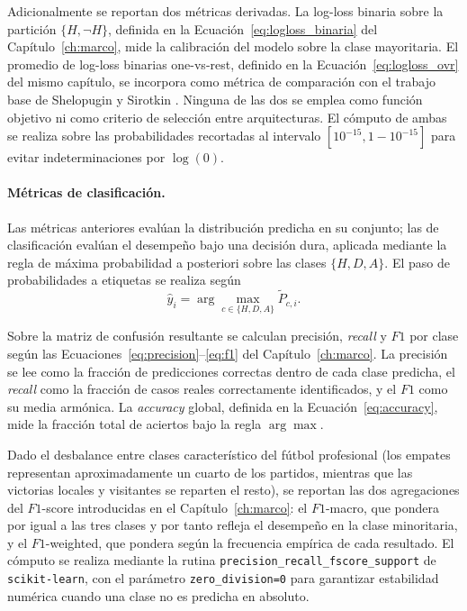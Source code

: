 Adicionalmente se reportan dos m\'etricas derivadas. La log-loss binaria sobre la partici\'on $\{H, \neg H\}$, definida en la Ecuaci\'on~\eqref{eq:logloss_binaria} del Cap\'itulo~\ref{ch:marco}, mide la calibraci\'on del modelo sobre la clase mayoritaria. El promedio de log-loss binarias one-vs-rest, definido en la Ecuaci\'on~\eqref{eq:logloss_ovr} del mismo cap\'itulo, se incorpora como m\'etrica de comparaci\'on con el trabajo base de Shelopugin y Sirotkin \cite{Glicko2Mod}. Ninguna de las dos se emplea como funci\'on objetivo ni como criterio de selecci\'on entre arquitecturas. El c\'omputo de ambas se realiza sobre las probabilidades recortadas al intervalo $[10^{-15}, 1-10^{-15}]$ para evitar indeterminaciones por $\log(0)$.

\paragraph{M\'etricas de clasificaci\'on.} Las m\'etricas 
anteriores eval\'uan la distribuci\'on predicha en su conjunto; las de clasificaci\'on eval\'uan el desempe\~no bajo una decisi\'on dura, aplicada mediante la regla de m\'axima probabilidad a posteriori sobre las clases $\{H, D, A\}$. El paso de probabilidades a etiquetas se realiza seg\'un
\begin{equation}
	\hat{y}_i = \arg\max_{c\in\{H,D,A\}} \tilde{P}_{c,i}.
	\label{eq:argmax_impl}
\end{equation}

Sobre la matriz de confusi\'on resultante se calculan precisi\'on, \emph{recall} y $F1$ por clase seg\'un las Ecuaciones~\eqref{eq:precision}--\eqref{eq:f1} del Cap\'itulo~\ref{ch:marco}. La precisi\'on se lee como la fracci\'on de predicciones correctas dentro de cada clase predicha, el \emph{recall} como la fracci\'on de casos reales correctamente identificados, y el $F1$ como su media arm\'onica. La \emph{accuracy} global, definida en la Ecuaci\'on~\eqref{eq:accuracy}, mide la fracci\'on total de aciertos bajo la regla $\arg\max$.

Dado el desbalance entre clases caracter\'istico del f\'utbol profesional (los empates representan aproximadamente un cuarto de los partidos, mientras que las victorias locales y visitantes se reparten el resto), se reportan las dos agregaciones del $F1$-score introducidas en el Cap\'itulo~\ref{ch:marco}: el $F1$-macro, que pondera por igual a las tres clases y por tanto refleja el desempe\~no en la clase minoritaria, y el $F1$-weighted, que pondera seg\'un la frecuencia emp\'irica de cada resultado. El c\'omputo se realiza mediante la rutina \texttt{precision\_recall\_fscore\_support} de 
\texttt{scikit-learn}, con el par\'ametro \texttt{zero\_division=0} para garantizar estabilidad num\'erica cuando una clase no es predicha en absoluto.

